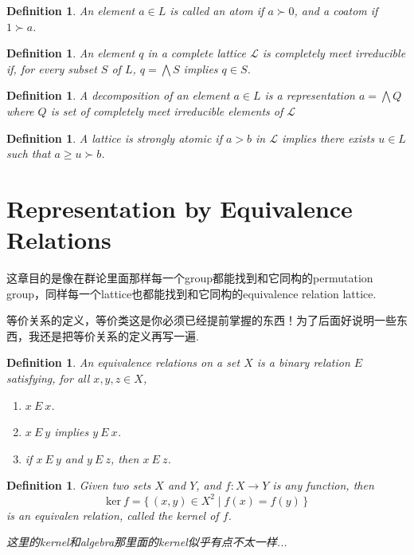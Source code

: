 \documentclass{article}
\newtheorem{definition}[theorem]{Definition}
\newcommand*{\xfunc}[4]{{#2}\colon{#3}{#1}{#4}}
\newcommand*{\func}[3]{\xfunc{\to}{#1}{#2}{#3}}
\newcommand\Set[2]{\{\,#1\mid#2\,\}} %
\newcommand\lattice{\mathcal{L}}
\begin{document}
\begin{definition}
\rm An element $a \in L$ is  called an {\color{red} atom} if $a \succ 0$, and a {\color{red} coatom} if $1 \succ a$. 
\end{definition}

\begin{definition}
\rm An element $q$ in a complete lattice $\lattice$ is {\color{red} completely meet irreducible} if, for every subset $S$ of $L$, $q  = \bigwedge S$ implies $q \in S$.
\end{definition}

\begin{definition}
\rm A {\color{red} decomposition} of an element $a \in L$ is a representation $a = \bigwedge Q$ where $Q$ is set of completely meet irreducible elements of $\lattice$
\end{definition}

\begin{definition}
\rm A lattice is {\color{red} strongly atomic} if $a>b$ in $\lattice$ implies there exists $u \in L$ such that $a \geq u \succ b$.
\end{definition}

\newpage
\section{Representation by Equivalence Relations}

{\color{red} 这章目的是像在群论里面那样每一个group都能找到和它同构的permutation group，同样每一个lattice也都能找到和它同构的equivalence relation lattice}.

{\color{blue} 等价关系的定义，等价类这是你必须已经提前掌握的东西！为了后面好说明一些东西，我还是把等价关系的定义再写一遍}.

\begin{definition}
\rm An {\color{red} equivalence relations} on a set $X$ is a binary relation $E$ satisfying, for all $x, y, z \in X$,
\begin{enumerate}
	\item $x~E~x$.
	\item $x~E~y$ implies $y~E~x$.
	\item if $x~E~y$ and $y~E~z$, then $x~E~z$.
\end{enumerate}
\end{definition}

\begin{definition}
\rm Given two sets $X$ and $Y$, and $\func{f}{X}{Y}$ is any function, then 
$$
\text{ker}~f = \Set{(x,y) \in X^2}{f(x) = f(y)}
$$
is an equivalen relation, called the kernel of $f$. 

{\color{blue} 这里的kernel和algebra那里面的kernel似乎有点不太一样...}
\end{definition}
\end{document}
